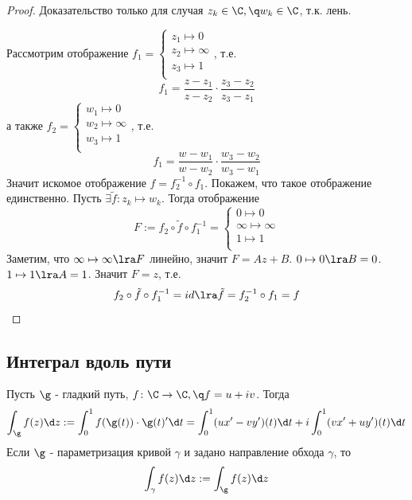\begin{proof}
   Доказательство только для случая $z_k\in\C,\q w_k\in\C$, т.к. лень.

  Рассмотрим отображение $f_1= 
  \begin{cases}
    z_1\mapsto 0\\
    z_2\mapsto \infty\\
    z_3\mapsto 1\\
  \end{cases}$, т.е.
  \[f_1=\frac{z-z_1}{z-z_2}\cdot \frac{z_3-z_2}{z_3-z_1}\]
  а также $f_2= 
  \begin{cases}
    w_1\mapsto 0\\
    w_2\mapsto \infty\\
    w_3\mapsto 1\\
  \end{cases}$, т.е.
  \[f_1=\frac{w-w_1}{w-w_2}\cdot \frac{w_3-w_2}{w_3-w_1}\]
  Значит искомое отображение $f=f_2^{-1}\circ f_1$. Покажем, что такое отображение единственно. Пусть $\exists \tilde{f}\colon z_k\mapsto w_k$. Тогда отображение
  \[F:=f_2\circ \tilde{f}\circ f_1^{-1} = 
  \begin{cases}
    0\mapsto 0\\
    \infty\mapsto \infty\\
    1\mapsto 1\\
  \end{cases}\]
  Заметим, что $\infty\mapsto \infty\lra F$ линейно, значит $F=Az+B$. $0\mapsto 0\lra B=0$. $1\mapsto 1\lra A=1$. Значит $F=z$, т.е.
  \[f_2\circ \tilde{f}\circ f_1^{-1}=id\lra \tilde{f} = f_2^{-1}\circ f_1=f\]
\end{proof}
\subsection{Интеграл вдоль пути}
\begin{definition}
  Пусть $\g$ - гладкий путь, $f\colon\C\to\C,\q f=u+iv$. Тогда
  \[\int_{\g}f(z)\d z:=\int_{0}^{1}f(\g(t))\cdot \g(t)'\d t=\int_{0}^{1}(ux'-vy')(t)\d t + i \int_{0}^{1}(vx' + uy')(t)\d t\]
  Если $\g$ - параметризация кривой $\gamma$ и задано направление обхода $\gamma$, то
  \[\int_{\gamma}f(z)\d z := \int_{\g}f(z)\d z\]
\end{definition}

